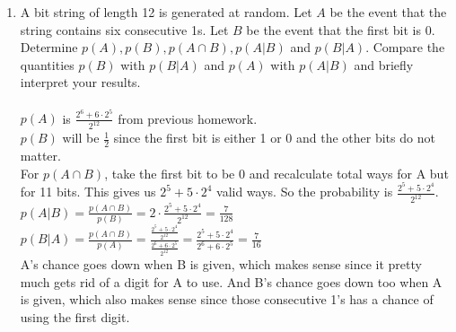 \documentclass[12pt]{letter}
\begin{document}
\begin{enumerate}
\item A bit string of length 12 is generated at random. Let $A$ be the event that the string contains six consecutive 1s. Let $B$ be the event that the first bit is 0. Determine $p(A), p(B), p(A \cap B), p(A | B)$ and $p(B|A)$. Compare the quantities $p(B)$ with $p(B|A)$ and $p(A)$ with $p(A|B)$ and briefly interpret your results.\\\\
$p(A)$ is $\frac{2^6+6\cdot2^5}{2^{12}}$ from previous homework.\\
$p(B)$ will be $\frac{1}{2}$ since the first bit is either 1 or 0 and the other bits do not matter.\\
For $p(A \cap B)$, take the first bit to be 0 and recalculate total ways for A but for 11 bits. This gives us $2^5+5\cdot2^4$ valid ways. So the probability is $\frac{2^5+5\cdot2^4}{2^{12}}$.\\
$p(A | B) = \frac{p(A\cap B)}{p(B)} = 2\cdot\frac{2^5+5\cdot2^4}{2^{12}} = \frac{7}{128}$\\
$p(B|A) = \frac{p(A\cap B)}{p(A)} = \frac{\frac{2^5+5\cdot2^4}{2^{12}}}{\frac{2^6+6\cdot2^5}{2^{12}}} = \frac{2^5+5\cdot2^4}{2^6+6\cdot2^5} = \frac{7}{16}$\\
A's chance goes down when B is given, which makes sense since it pretty much gets rid of a digit for A to use. And B's chance goes down too when A is given, which also makes sense since those consecutive 1's has a chance of using the first digit.
\end{enumerate}
\end{document}

